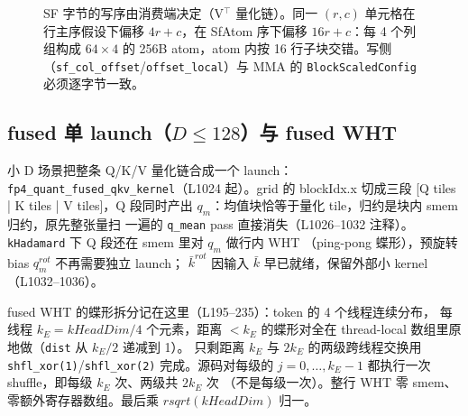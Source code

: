 \begin{figure}[H]
\caption{SF 字节的写序由消费端决定（V$^\top$ 量化链）。同一 $(r,c)$ 单元格在
行主序假设下偏移 $4r+c$，在 SfAtom 序下偏移 $16r+c$：每 4 个列组构成
$64{\times}4$ 的 256B atom，atom 内按 16 行子块交错。写侧
（\texttt{sf\_col\_offset}/\texttt{offset\_local}）与 MMA 的
\texttt{BlockScaledConfig} 必须逐字节一致。}
\label{fig:31-sf-order}
\end{figure}

\subsection{fused 单 launch（$D\le128$）与 fused WHT}

小 D 场景把整条 Q/K/V 量化链合成一个 launch：
\texttt{fp4\_quant\_fused\_qkv\_kernel}（L1024 起）。grid 的
blockIdx.x 切成三段 [Q tiles | K tiles | V tiles]，Q 段同时产出
$q_m$：均值块恰等于量化 tile，归约是块内 smem 归约，原先整张量扫
一遍的 \texttt{q\_mean} pass 直接消失（L1026--1032 注释）。
\texttt{kHadamard} 下 Q 段还在 smem 里对 $q_m$ 做行内 WHT
（ping-pong 蝶形），预旋转 bias $q_m^{rot}$ 不再需要独立 launch；
$\bar k^{rot}$ 因输入 $\bar k$ 早已就绪，保留外部小 kernel
（L1032--1036）。

fused WHT 的蝶形拆分记在这里（L195--235）：token 的 4 个线程连续分布，
每线程 $k_E=kHeadDim/4$ 个元素，距离 $<k_E$ 的蝶形对全在
thread-local 数组里原地做（\texttt{dist} 从 $k_E/2$ 递减到 1）。
只剩距离 $k_E$ 与 $2k_E$ 的两级跨线程交换用
\texttt{shfl\_xor(1)}/\texttt{shfl\_xor(2)} 完成。源码对每级的
$j=0,\dots,k_E-1$ 都执行一次 shuffle，即每级 $k_E$ 次、两级共 $2k_E$ 次
（不是每级一次）。整行 WHT 零 smem、零额外寄存器数组。最后乘
$rsqrt(kHeadDim)$ 归一。

